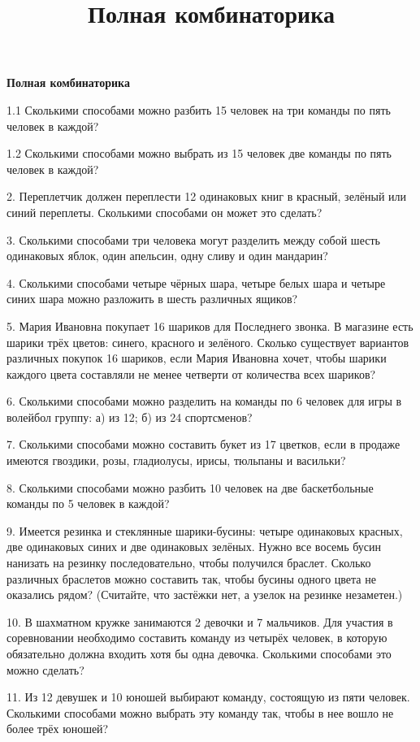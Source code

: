 \centerline{\bf \Huge Полная комбинаторика}
\title{Полная комбинаторика}


1.1 Сколькими способами можно разбить 15 человек на три команды по пять человек в каждой?

1.2 Сколькими способами можно выбрать из 15 человек две команды по пять человек в каждой?

2. Переплетчик должен переплести 12 одинаковых книг в красный, зелёный или синий переплеты. Сколькими способами он может это сделать?

3. Сколькими способами три человека могут разделить между собой шесть одинаковых яблок, один апельсин, одну сливу и один мандарин?

4. Сколькими способами четыре чёрных шара, четыре белых шара и четыре синих шара можно разложить в шесть различных ящиков?

5. Мария Ивановна покупает 16 шариков для Последнего звонка. В магазине есть шарики трёх цветов: синего, красного и зелёного. Сколько существует вариантов различных покупок 16 шариков, если Мария Ивановна хочет, чтобы шарики каждого цвета составляли не менее четверти от количества всех шариков?

6. Сколькими способами можно разделить на команды по 6 человек для игры в волейбол группу:
а) из 12; б) из 24 спортсменов?

7. Сколькими способами можно составить букет из 17 цветков, если в продаже имеются гвоздики, розы, гладиолусы, ирисы, тюльпаны и васильки?

8. Сколькими способами можно разбить 10 человек на две баскетбольные команды по 5 человек в каждой?

9. Имеется резинка и стеклянные шарики-бусины: четыре одинаковых красных, две одинаковых синих и две одинаковых зелёных. Нужно все восемь бусин нанизать на резинку последовательно, чтобы получился браслет. Сколько различных браслетов можно составить так, чтобы бусины одного цвета не оказались рядом? (Считайте, что застёжки нет, а узелок на резинке незаметен.)

10. В шахматном кружке занимаются 2 девочки и 7 мальчиков. Для участия в соревновании необходимо составить команду из четырёх человек, в которую обязательно должна входить хотя бы одна девочка. Сколькими способами это можно сделать?

11. Из 12 девушек и 10 юношей выбирают команду, состоящую из пяти человек.
Сколькими способами можно выбрать эту команду так, чтобы в нее вошло не более трёх юношей?

\newpage 

